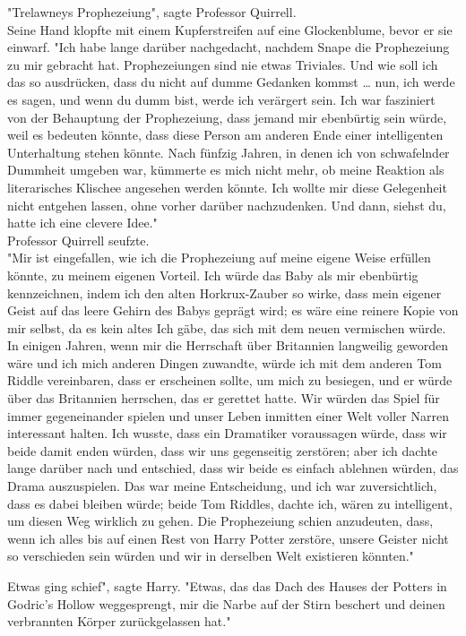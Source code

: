 {"Trelawneys Prophezeiung", sagte Professor Quirrell.\\ Seine Hand klopfte mit einem Kupferstreifen auf eine Glockenblume, bevor er sie einwarf. "Ich habe lange darüber nachgedacht, nachdem Snape die Prophezeiung zu mir gebracht hat. Prophezeiungen sind nie etwas Triviales. Und wie soll ich das so ausdrücken, dass du nicht auf dumme Gedanken kommst … nun, ich werde es sagen, und wenn du dumm bist, werde ich verärgert sein. Ich war fasziniert von der Behauptung der Prophezeiung, dass jemand mir ebenbürtig sein würde, weil es bedeuten könnte, dass diese Person am anderen Ende einer intelligenten Unterhaltung stehen könnte. Nach fünfzig Jahren, in denen ich von schwafelnder Dummheit umgeben war, kümmerte es mich nicht mehr, ob meine Reaktion als literarisches Klischee angesehen werden könnte. Ich wollte mir diese Gelegenheit nicht entgehen lassen, ohne vorher darüber nachzudenken. Und dann, siehst du, hatte ich eine clevere Idee."\\ Professor Quirrell seufzte.\\ "Mir ist eingefallen, wie ich die Prophezeiung auf meine eigene Weise erfüllen könnte, zu meinem eigenen Vorteil. Ich würde das Baby als mir ebenbürtig kennzeichnen, indem ich den alten Horkrux-Zauber so wirke, dass mein eigener Geist auf das leere Gehirn des Babys geprägt wird; es wäre eine reinere Kopie von mir selbst, da es kein altes Ich gäbe, das sich mit dem neuen vermischen würde. In einigen Jahren, wenn mir die Herrschaft über Britannien langweilig geworden wäre und ich mich anderen Dingen zuwandte, würde ich mit dem anderen Tom Riddle vereinbaren, dass er erscheinen sollte, um mich zu besiegen, und er würde über das Britannien herrschen, das er gerettet hatte. Wir würden das Spiel für immer gegeneinander spielen und unser Leben inmitten einer Welt voller Narren interessant halten. Ich wusste, dass ein Dramatiker voraussagen würde, dass wir beide damit enden würden, dass wir uns gegenseitig zerstören; aber ich dachte lange darüber nach und entschied, dass wir beide es einfach ablehnen würden, das Drama auszuspielen. Das war meine Entscheidung, und ich war zuversichtlich, dass es dabei bleiben würde; beide Tom Riddles, dachte ich, wären zu intelligent, um diesen Weg wirklich zu gehen. Die Prophezeiung schien anzudeuten, dass, wenn ich alles bis auf einen Rest von Harry Potter zerstöre, unsere Geister nicht so verschieden sein würden und wir in derselben Welt existieren könnten."

Etwas ging schief", sagte Harry. "Etwas, das das Dach des Hauses der Potters in Godric's Hollow weggesprengt, mir die Narbe auf der Stirn beschert und deinen verbrannten Körper zurückgelassen hat."

}
